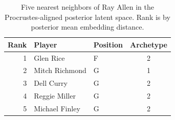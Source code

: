 \begin{table}[htbp]
  \centering\small
  \begin{tabular}{rllc}
    \toprule
    Rank & Player & Position & Archetype \\
    \midrule
    1 & Glen Rice & F & 2 \\
    2 & Mitch Richmond & G & 1 \\
    3 & Dell Curry & G & 2 \\
    4 & Reggie Miller & G & 2 \\
    5 & Michael Finley & G & 2 \\
    \bottomrule
  \end{tabular}
  \caption{Five nearest neighbors of Ray Allen in the Procrustes-aligned posterior latent space. Rank is by posterior mean embedding distance.}
  \label{tab:Ray_Allen_neighbors}
\end{table}

